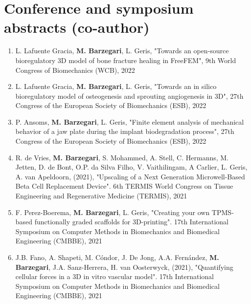 \section*{Conference and symposium abstracts (co-author)}

\begin{enumerate}
\item
L. Lafuente Gracia, \textbf{M. Barzegari}, L. Geris, "Towards an open-source bioregulatory 3D model of bone fracture healing in FreeFEM", 9th World Congress of Biomechanics (WCB), 2022
\item
L. Lafuente Gracia, \textbf{M. Barzegari}, L. Geris, "Towards an in silico bioregulatory model of osteogenesis and sprouting angiogenesis in 3D", 27th Congress of the European Society of Biomechanics (ESB), 2022
\item
P. Ansoms, \textbf{M. Barzegari}, L. Geris, "Finite element analysis of mechanical behavior of a jaw plate during the implant biodegradation process", 27th Congress of the European Society of Biomechanics (ESB), 2022
\item
R. de Vries, \textbf{M. Barzegari}, S. Mohammed, A. Stell, C. Hermanns, M. Jetten, D. de Bont, O.P. da Silva Filho, V. Vaithilingam, A Carlier, L. Geris, A. van Apeldoorn, (2021), "Upscaling of a Next Generation Microwell-Based Beta Cell Replacement Device". 6th TERMIS World Congress on Tissue Engineering and Regenerative Medicine (TERMIS), 2021
\item
F. Perez-Boerema, \textbf{M. Barzegari}, L. Geris, "Creating your own TPMS-based functionally graded scaffolds for 3D-printing". 17th International Symposium on Computer Methods in Biomechanics and Biomedical Engineering (CMBBE), 2021
\item
J.B. Fano, A. Shapeti, M. Cóndor, J. De Jong, A.A. Fernández, \textbf{M. Barzegari}, J.A. Sanz-Herrera, H. van Oosterwyck, (2021), "Quantifying cellular forces in a 3D in vitro vascular model". 17th International Symposium on Computer Methods in Biomechanics and Biomedical Engineering (CMBBE), 2021
\end{enumerate}


\cleardoublepage

